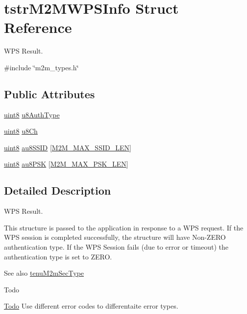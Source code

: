 \hypertarget{structtstrM2MWPSInfo}{}\section{tstr\+M2\+M\+W\+P\+S\+Info Struct Reference}
\label{structtstrM2MWPSInfo}


W\+PS Result.  




{\ttfamily \#include \char`\"{}m2m\+\_\+types.\+h\char`\"{}}

\subsection*{Public Attributes}
\begin{DoxyCompactItemize}
\item 
\hyperlink{group__DataT_ga4df709a77647e870bbf1d955b8edc9a6}{uint8} \hyperlink{structtstrM2MWPSInfo_a6d61ebf61a47c7a83231fac0800c49c9}{u8\+Auth\+Type}
\item 
\hyperlink{group__DataT_ga4df709a77647e870bbf1d955b8edc9a6}{uint8} \hyperlink{structtstrM2MWPSInfo_a693e6204dbbe233cbf7aaa26e33d9f5c}{u8\+Ch}
\item 
\hyperlink{group__DataT_ga4df709a77647e870bbf1d955b8edc9a6}{uint8} \hyperlink{structtstrM2MWPSInfo_a679b8247d9099096deffa1522dccbbde}{au8\+S\+S\+ID} \mbox{[}\hyperlink{group__WlanDefines_gab2bd95c18ede2fbc07b44c5660cc0097}{M2\+M\+\_\+\+M\+A\+X\+\_\+\+S\+S\+I\+D\+\_\+\+L\+EN}\mbox{]}
\item 
\hyperlink{group__DataT_ga4df709a77647e870bbf1d955b8edc9a6}{uint8} \hyperlink{structtstrM2MWPSInfo_a38d83b9735bd2ebc5304d1f6d3c6c879}{au8\+P\+SK} \mbox{[}\hyperlink{group__WlanDefines_ga790a7e0471ff8a179238863dc2021f6d}{M2\+M\+\_\+\+M\+A\+X\+\_\+\+P\+S\+K\+\_\+\+L\+EN}\mbox{]}
\end{DoxyCompactItemize}


\subsection{Detailed Description}
W\+PS Result. 

This structure is passed to the application in response to a W\+PS request. If the W\+PS session is completed successfully, the structure will have Non-\/\+Z\+E\+RO authentication type. If the W\+PS Session fails (due to error or timeout) the authentication type is set to Z\+E\+RO.

\begin{DoxySeeAlso}{See also}
\hyperlink{group__WlanEnums_gaa232a09c953ec8200c13774f94107b05}{tenu\+M2m\+Sec\+Type}
\end{DoxySeeAlso}
\begin{DoxyRefDesc}{Todo}
\item[\hyperlink{todo__todo000001}{Todo}]Use different error codes to differentaite error types. \end{DoxyRefDesc}



